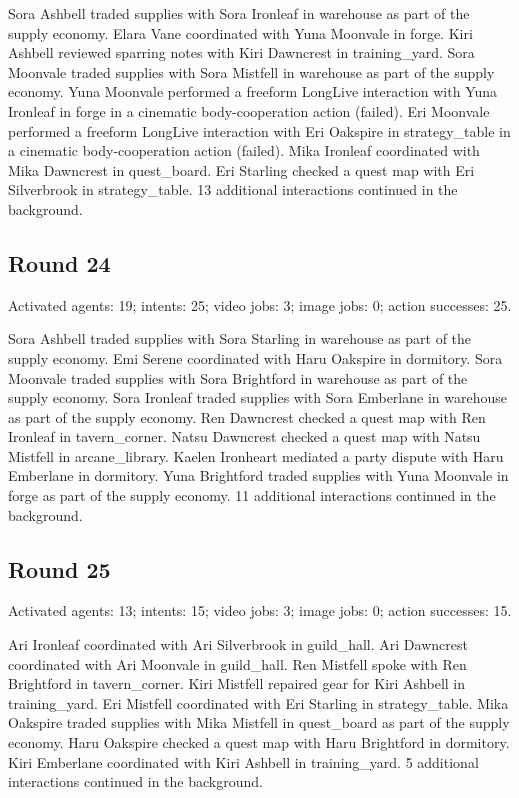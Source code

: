 \documentclass[11pt,a4paper]{article}
\begin{document}
Sora Ashbell traded supplies with Sora Ironleaf in warehouse as part of the supply economy. Elara Vane coordinated with Yuna Moonvale in forge. Kiri Ashbell reviewed sparring notes with Kiri Dawncrest in training\_yard. Sora Moonvale traded supplies with Sora Mistfell in warehouse as part of the supply economy. Yuna Moonvale performed a freeform LongLive interaction with Yuna Ironleaf in forge in a cinematic body-cooperation action (failed). Eri Moonvale performed a freeform LongLive interaction with Eri Oakspire in strategy\_table in a cinematic body-cooperation action (failed). Mika Ironleaf coordinated with Mika Dawncrest in quest\_board. Eri Starling checked a quest map with Eri Silverbrook in strategy\_table. 13 additional interactions continued in the background.

\subsection{Round 24}
Activated agents: 19; intents: 25; video jobs: 3; image jobs: 0; action successes: 25.

Sora Ashbell traded supplies with Sora Starling in warehouse as part of the supply economy. Emi Serene coordinated with Haru Oakspire in dormitory. Sora Moonvale traded supplies with Sora Brightford in warehouse as part of the supply economy. Sora Ironleaf traded supplies with Sora Emberlane in warehouse as part of the supply economy. Ren Dawncrest checked a quest map with Ren Ironleaf in tavern\_corner. Natsu Dawncrest checked a quest map with Natsu Mistfell in arcane\_library. Kaelen Ironheart mediated a party dispute with Haru Emberlane in dormitory. Yuna Brightford traded supplies with Yuna Moonvale in forge as part of the supply economy. 11 additional interactions continued in the background.

\subsection{Round 25}
Activated agents: 13; intents: 15; video jobs: 3; image jobs: 0; action successes: 15.

Ari Ironleaf coordinated with Ari Silverbrook in guild\_hall. Ari Dawncrest coordinated with Ari Moonvale in guild\_hall. Ren Mistfell spoke with Ren Brightford in tavern\_corner. Kiri Mistfell repaired gear for Kiri Ashbell in training\_yard. Eri Mistfell coordinated with Eri Starling in strategy\_table. Mika Oakspire traded supplies with Mika Mistfell in quest\_board as part of the supply economy. Haru Oakspire checked a quest map with Haru Brightford in dormitory. Kiri Emberlane coordinated with Kiri Ashbell in training\_yard. 5 additional interactions continued in the background.
\end{document}
